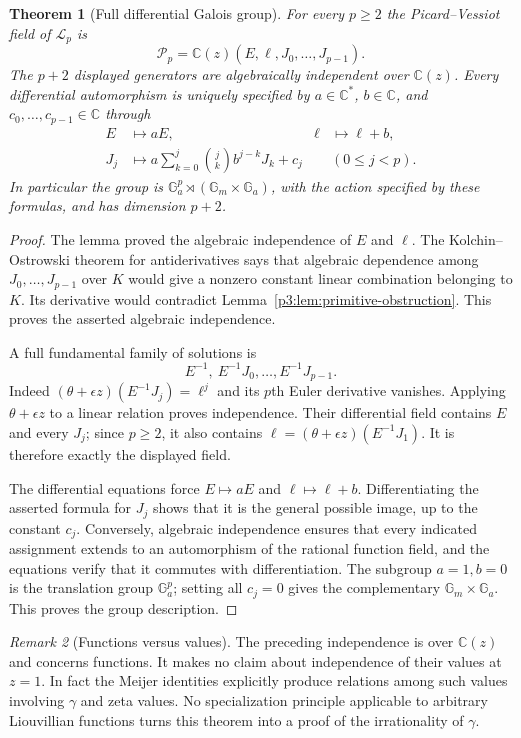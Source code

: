 \documentclass[11pt,a4paper]{article}
\newtheorem{theorem}{Theorem}[section]
\theoremstyle{definition}
\theoremstyle{remark}
\newtheorem{remark}[theorem]{Remark}
\numberwithin{equation}{section}
\begin{document}
\begin{theorem}[Full differential Galois group]\label{p3:thm:full-meijer-group}
For every $p\ge2$ the Picard--Vessiot field of $\mathcal L_p$ is
\[
 \mathcal P_p=\mathbb C(z)(E,\ell,J_0,\ldots,J_{p-1}).
\]
The $p+2$ displayed generators are algebraically independent over
$\mathbb C(z)$.  Every differential automorphism is uniquely specified
by $a\in\mathbb C^*$, $b\in\mathbb C$, and
$c_0,\ldots,c_{p-1}\in\mathbb C$ through
\begin{align*}
 E&\longmapsto aE,&\ell&\longmapsto\ell+b,\\
 J_j&\longmapsto
 a\sum_{k=0}^j\binom jk b^{j-k}J_k+c_j
 &&(0\le j<p).
\end{align*}
In particular the group is
$\mathbb G_a^p\rtimes(\mathbb G_m\times\mathbb G_a)$,
with the action specified by these formulas, and has dimension $p+2$.
\end{theorem}
\begin{proof}
The lemma proved the algebraic independence of $E$ and $\ell$.
The Kolchin--Ostrowski theorem for antiderivatives
\cite[Theorem~2.3]{p3:Srinivasan2008} says that algebraic dependence among
$J_0,\ldots,J_{p-1}$ over $K$ would give a nonzero constant linear
combination belonging to $K$.  Its derivative would contradict
Lemma~\ref{p3:lem:primitive-obstruction}.  This proves the asserted
algebraic independence.

A full fundamental family of solutions is
\[
 E^{-1},\ E^{-1}J_0,\ldots,E^{-1}J_{p-1}.
\]
Indeed $(\theta+\epsilon z)(E^{-1}J_j)=\ell^j$ and its $p$th
Euler derivative vanishes.  Applying $\theta+\epsilon z$ to a linear
relation proves independence.  Their differential field contains $E$
and every $J_j$; since $p\ge2$, it also contains
$\ell=(\theta+\epsilon z)(E^{-1}J_1)$.
It is therefore exactly the displayed field.

The differential equations force $E\mapsto aE$ and
$\ell\mapsto\ell+b$.  Differentiating the asserted formula for $J_j$
shows that it is the general possible image, up to the constant $c_j$.
Conversely, algebraic independence ensures that every indicated
assignment extends to an automorphism of the rational function field,
and the equations verify that it commutes with differentiation.
The subgroup $a=1,b=0$ is the translation group $\mathbb G_a^p$;
setting all $c_j=0$ gives the complementary
$\mathbb G_m\times\mathbb G_a$.  This proves the group description.
\end{proof}

\begin{remark}[Functions versus values]
The preceding independence is over $\mathbb C(z)$ and concerns
functions.  It makes no claim about independence of their values at
$z=1$.  In fact the Meijer identities explicitly produce relations
among such values involving $\gamma$ and zeta values.  No specialization
principle applicable to arbitrary Liouvillian functions turns this
theorem into a proof of the irrationality of $\gamma$.
\end{remark}
\end{document}
